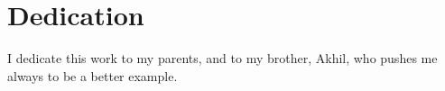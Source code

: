 \chapter*{Dedication}

I dedicate this work to my parents,
and to my brother, Akhil,
who pushes me always to be a better example.
